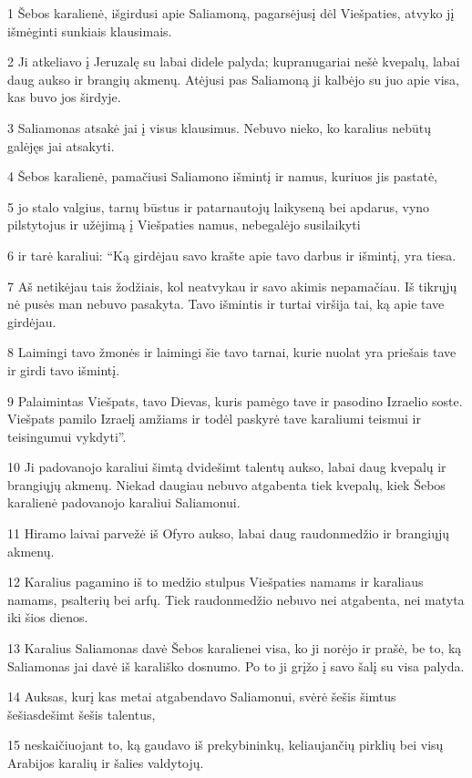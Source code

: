 \par 1 Šebos karalienė, išgirdusi apie Saliamoną, pagarsėjusį dėl Viešpaties, atvyko jį išmėginti sunkiais klausimais. 
\par 2 Ji atkeliavo į Jeruzalę su labai didele palyda; kupranugariai nešė kvepalų, labai daug aukso ir brangių akmenų. Atėjusi pas Saliamoną ji kalbėjo su juo apie visa, kas buvo jos širdyje. 
\par 3 Saliamonas atsakė jai į visus klausimus. Nebuvo nieko, ko karalius nebūtų galėjęs jai atsakyti. 
\par 4 Šebos karalienė, pamačiusi Saliamono išmintį ir namus, kuriuos jis pastatė, 
\par 5 jo stalo valgius, tarnų būstus ir patarnautojų laikyseną bei apdarus, vyno pilstytojus ir užėjimą į Viešpaties namus, nebegalėjo susilaikyti 
\par 6 ir tarė karaliui: “Ką girdėjau savo krašte apie tavo darbus ir išmintį, yra tiesa. 
\par 7 Aš netikėjau tais žodžiais, kol neatvykau ir savo akimis nepamačiau. Iš tikrųjų nė pusės man nebuvo pasakyta. Tavo išmintis ir turtai viršija tai, ką apie tave girdėjau. 
\par 8 Laimingi tavo žmonės ir laimingi šie tavo tarnai, kurie nuolat yra priešais tave ir girdi tavo išmintį. 
\par 9 Palaimintas Viešpats, tavo Dievas, kuris pamėgo tave ir pasodino Izraelio soste. Viešpats pamilo Izraelį amžiams ir todėl paskyrė tave karaliumi teismui ir teisingumui vykdyti”. 
\par 10 Ji padovanojo karaliui šimtą dvidešimt talentų aukso, labai daug kvepalų ir brangiųjų akmenų. Niekad daugiau nebuvo atgabenta tiek kvepalų, kiek Šebos karalienė padovanojo karaliui Saliamonui. 
\par 11 Hiramo laivai parvežė iš Ofyro aukso, labai daug raudonmedžio ir brangiųjų akmenų. 
\par 12 Karalius pagamino iš to medžio stulpus Viešpaties namams ir karaliaus namams, psalterių bei arfų. Tiek raudonmedžio nebuvo nei atgabenta, nei matyta iki šios dienos. 
\par 13 Karalius Saliamonas davė Šebos karalienei visa, ko ji norėjo ir prašė, be to, ką Saliamonas jai davė iš karališko dosnumo. Po to ji grįžo į savo šalį su visa palyda. 
\par 14 Auksas, kurį kas metai atgabendavo Saliamonui, svėrė šešis šimtus šešiasdešimt šešis talentus, 
\par 15 neskaičiuojant to, ką gaudavo iš prekybininkų, keliaujančių pirklių bei visų Arabijos karalių ir šalies valdytojų. 
